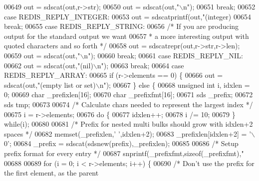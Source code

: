 \begin{DoxyCode}
{{{{{{{{{{{{{{{{{{00649         out = sdscat(out,r->str);
00650         out = sdscat(out,\textcolor{stringliteral}{"\(\backslash\)n"});
00651     \textcolor{keywordflow}{break};
00652     \textcolor{keywordflow}{case} REDIS\_REPLY\_INTEGER:
00653         out = sdscatprintf(out,\textcolor{stringliteral}{"(integer) %
00654     \textcolor{keywordflow}{break};
00655     \textcolor{keywordflow}{case} REDIS\_REPLY\_STRING:
00656         \textcolor{comment}{/* If you are producing output for the standard output we want}
00657 \textcolor{comment}{        * a more interesting output with quoted characters and so forth */}
00658         out = sdscatrepr(out,r->str,r->len);
00659         out = sdscat(out,\textcolor{stringliteral}{"\(\backslash\)n"});
00660     \textcolor{keywordflow}{break};
00661     \textcolor{keywordflow}{case} REDIS\_REPLY\_NIL:
00662         out = sdscat(out,\textcolor{stringliteral}{"(nil)\(\backslash\)n"});
00663     \textcolor{keywordflow}{break};
00664     \textcolor{keywordflow}{case} REDIS\_REPLY\_ARRAY:
00665         \textcolor{keywordflow}{if} (r->elements == 0) \{
00666             out = sdscat(out,\textcolor{stringliteral}{"(empty list or set)\(\backslash\)n"});
00667         \} \textcolor{keywordflow}{else} \{
00668             \textcolor{keywordtype}{unsigned} \textcolor{keywordtype}{int} i, idxlen = 0;
00669             \textcolor{keywordtype}{char} \_prefixlen[16];
00670             \textcolor{keywordtype}{char} \_prefixfmt[16];
00671             sds \_prefix;
00672             sds tmp;
00673 
00674             \textcolor{comment}{/* Calculate chars needed to represent the largest index */}
00675             i = r->elements;
00676             \textcolor{keywordflow}{do} \{
00677                 idxlen++;
00678                 i /= 10;
00679             \} \textcolor{keywordflow}{while}(i);
00680 
00681             \textcolor{comment}{/* Prefix for nested multi bulks should grow with idxlen+2 spaces */}
00682             memset(\_prefixlen,\textcolor{stringliteral}{' '},idxlen+2);
00683             \_prefixlen[idxlen+2] = \textcolor{stringliteral}{'\(\backslash\)0'};
00684             \_prefix = sdscat(sdsnew(prefix),\_prefixlen);
00685 
00686             \textcolor{comment}{/* Setup prefix format for every entry */}
00687             snprintf(\_prefixfmt,\textcolor{keyword}{sizeof}(\_prefixfmt),\textcolor{stringliteral}{"%
00688 
00689             \textcolor{keywordflow}{for} (i = 0; i < r->elements; i++) \{
00690                 \textcolor{comment}{/* Don't use the prefix for the first element, as the parent}
}}}}}}}}}}}}}}}}}}}}
\end{DoxyCode}

